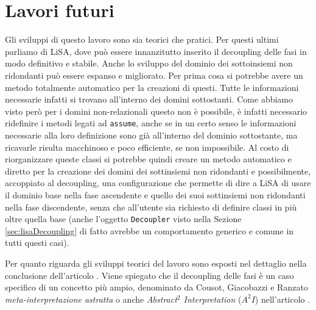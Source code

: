 \section{Lavori futuri}
Gli sviluppi di questo lavoro sono sia teorici che pratici. Per questi ultimi parliamo di LiSA, dove può essere innanzitutto inserito il decoupling delle fasi in modo definitivo e stabile. Anche lo sviluppo del dominio dei sottoinsiemi non ridondanti può essere espanso e migliorato. Per prima cosa si potrebbe avere un metodo totalmente automatico per la creazioni di questi. Tutte le informazioni necessarie infatti si trovano all'interno dei domini sottostanti. Come abbiamo visto però per i domini non-relazionali questo non è possibile, è infatti necessario ridefinire i metodi legati ad \texttt{assume}, anche se in un certo senso le informazioni necessarie alla loro definizione sono già all'interno del dominio sottostante, ma ricavarle risulta macchinoso e poco efficiente, se non impossibile. Al costo di riorganizzare queste classi si potrebbe quindi creare un metodo automatico e diretto per la creazione dei domini dei sottinsiemi non ridondanti e possibilmente, accoppiato al decoupling, una configurazione che permette di dire a LiSA di usare il dominio base nella fase ascendente e quello dei suoi sottinsiemi non ridondanti nella fase discendente, senza che all'utente sia richiesto di definire classi in più oltre quella base (anche l'oggetto \texttt{Decoupler} visto nella Sezione \ref{sec:lisaDecoupling} di fatto avrebbe un comportamento generico e comune in tutti questi casi). 

Per quanto riguarda gli sviluppi teorici del lavoro sono esposti nel dettaglio nella conclusione dell'articolo \cite{DBLP:conf/aplas/ArceriMZ22}. Viene spiegato che il decoupling delle fasi è un caso specifico di un concetto più ampio, denominato da Cousot, Giacobazzi e Ranzato \textit{meta-interpretazione astratta} o anche \textit{Abstract\(^2\) Interpretation} (\(A^2I\)) nell'articolo \cite{10.1145/3290355}. 
